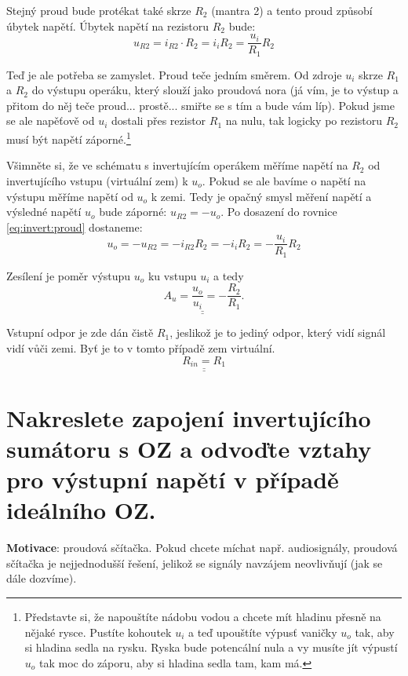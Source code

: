 \documentclass[a4paper,12pt]{article}   %
\begin{document}
Stejný proud bude protékat také skrze $R_2$ (mantra 2) a tento proud způsobí úbytek napětí. Úbytek napětí na rezistoru $R_2$ bude:
\begin{equation}
    u_{R2} = i_{R2}\cdot R_2 = i_i R_2 = \frac{u_i}{R_1} R_2
    \label{eq:invert:proud}
\end{equation}

Teď je ale potřeba se zamyslet. Proud teče jedním směrem. Od zdroje $u_i$ skrze $R_1$ a $R_2$ do výstupu operáku, který slouží jako proudová nora (já vím, je to výstup a přitom do něj teče proud... prostě... smiřte se s tím a bude vám líp). Pokud jsme se ale napěťově od $u_i$ dostali přes rezistor $R_1$ na nulu, tak logicky po rezistoru $R_2$ musí být napětí záporné.\footnote{Představte si, že napouštíte nádobu vodou a chcete mít hladinu přesně na nějaké rysce. Pustíte kohoutek $u_i$ a teď upouštíte výpusť vaničky $u_o$ tak, aby si hladina sedla na rysku. Ryska bude potencální nula a vy musíte jít výpustí $u_o$ tak moc do záporu, aby si hladina sedla tam, kam má.}

Všimněte si, že ve schématu s invertujícím operákem měříme napětí na $R_2$ od invertujícího vstupu (virtuální zem) k $u_o$. Pokud se ale bavíme o napětí na výstupu měříme napětí od $u_o$ k zemi. Tedy je opačný smysl měření napětí a výsledné napětí $u_o$ bude záporné: $u_{R2} = -u_o$. Po dosazení do rovnice \eqref{eq:invert:proud} dostaneme:
\begin{equation*}
    u_o = -u_{R2} = -i_{R2}R_2 = -i_i R_2 = -\frac{u_i}{R_1}R_2
\end{equation*}

Zesílení je poměr výstupu $u_o$ ku vstupu $u_i$ a tedy
\begin{equation*}
    \underline{\underline{A_u = \frac{u_o}{u_i} = -\frac{R_2}{R_1}}}.
\end{equation*}



Vstupní odpor je zde dán čistě $R_1$, jeslikož je to jediný odpor, který vidí signál vidí vůči zemi. Byť je to v tomto případě zem virtuální.
\begin{equation*}
    \underline{\underline{R_{in} = R_1}}
\end{equation*}


\section{Nakreslete zapojení invertujícího sumátoru s OZ a odvoďte vztahy pro výstupní napětí v případě ideálního OZ.}
\textbf{Motivace}: proudová sčítačka. Pokud chcete míchat např. audiosignály, proudová sčítačka je nejjednodušší řešení, jelikož se signály navzájem neovlivňují (jak se dále dozvíme).
\end{document}
